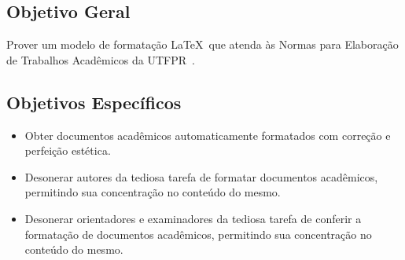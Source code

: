 \subsection{Objetivo Geral}

Prover um modelo de formata\c{c}\~ao \LaTeX\ que atenda \`as Normas para Elabora\c{c}\~ao de Trabalhos Acad\^emicos da UTFPR~\cite{UTFPR2008}.

\subsection{Objetivos Espec\'ificos}

\begin{itemize}
	\item Obter documentos acad\^emicos automaticamente formatados com corre\c{c}\~ao e perfei\c{c}\~ao est\'etica.
	\item Desonerar autores da tediosa tarefa de formatar documentos acad\^emicos, permitindo sua concentra\c{c}\~ao no conte\'udo do mesmo.
	\item Desonerar orientadores e examinadores da tediosa tarefa de conferir a formata\c{c}\~ao de documentos acad\^emicos, permitindo sua concentra\c{c}\~ao no conte\'udo do mesmo.
\end{itemize} 